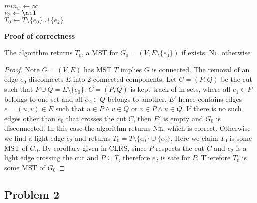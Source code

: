 \documentclass[11pt]{article}
\begin{document}
\begin{enumerate}
\begin{algorithm}[H]
{                

                $min_w \leftarrow \infty$\\
                $e_2 \leftarrow \nil$\\
                
               $T_0 \leftarrow T \setminus \{e_0 \}\cup \{e_2 \}$\\
            }
        \end{algorithm}


        \textbf{Proof of correctness}
        \begin{proposition*}
             The algorithm returns $T_0$, a MST for $G_0= (V ,E \setminus \{e_0\})$ if exists, \textsc{Nil} otherwise
             \begin{proof}
                Note $G = (V,E)$ has MST $T$ implies $G$ is connected. The removal of an edge $e_0$ disconnects $E$ into 2 connected components. Let $C = (P,Q)$ be the cut such that $P\cup Q = E\setminus \{ e_0 \}$. $C = (P,Q)$ is kept track of in sets, where all $e_1\in P$ belongs to one set and all $e_2\in Q$ belongs to another. $E'$ hence contains edges $e = (u,v)\in E$ such that $u\in P \land v\in Q$ or $v\in P \land u\in Q$. If there is no such edges other than $e_0$ that crosses the cut $C$, then $E'$ is empty and $G_0$ is disconnected. In this case the algorithm returns \textsc{Nil}, which is correct. Otherwise we find a light edge $e_2$ and returns $T_0 = T \setminus \{e_0 \}\cup \{e_2 \}$. Here we claim $T_0$ is some MST of $G_0$. By corollary given in CLRS, since $P$ respects the cut $C$ and $e_2$ is a light edge crossing the cut and $P\subseteq T$, therefore $e_2$ is safe for $P$. Therefore $T_0$ is some MST of $G_0$
            \end{proof}
        \end{proposition*}

\end{enumerate}


\subsection*{Problem 2}
\end{document}
